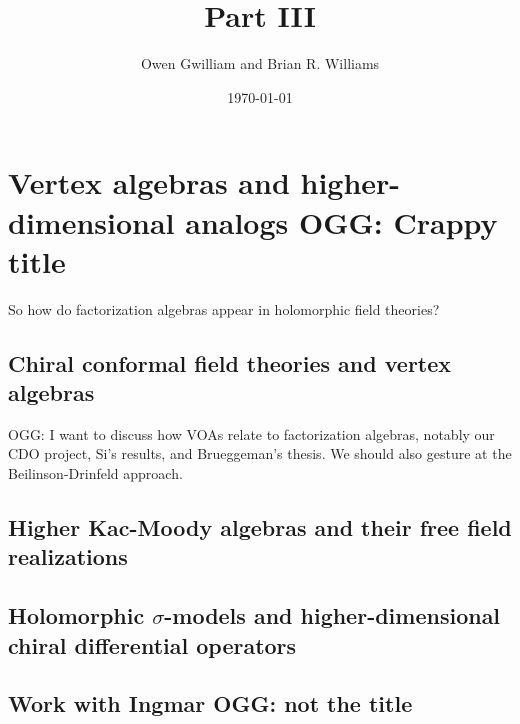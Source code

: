 \documentclass[11pt]{amsart}
\author{Owen Gwilliam and Brian R. Williams}
\date{\today}
\title{Part III}
\def\owen#1{{\textcolor{green!65!black}{OGG: {#1}}}}
\begin{document}
\maketitle

\section{Vertex algebras and higher-dimensional analogs \owen{Crappy title}}

So how do factorization algebras appear in holomorphic field theories?


\subsection{Chiral conformal field theories and vertex algebras}

\owen{I want to discuss how VOAs relate to factorization algebras, notably our CDO project, Si's results, and Brueggeman's thesis. We should also gesture at the Beilinson-Drinfeld approach.}

\subsection{Higher Kac-Moody algebras and their free field realizations}

\subsection{Holomorphic $\sigma$-models and higher-dimensional chiral differential operators}

\subsection{Work with Ingmar \owen{not the title}}
\end{document}
